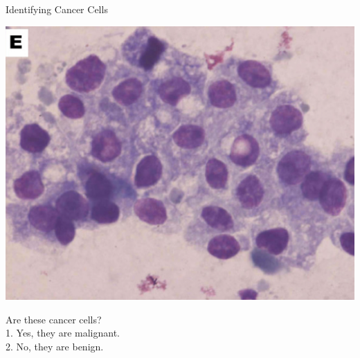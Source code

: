 \documentclass[8pt,aspectratio=169]{beamer}
\begin{document}
\begin{frame}{Identifying Cancer Cells}

\begin{center}
  \pause
  \includegraphics[scale=0.5]{figures/cancer-cells}
  \vspace{5mm}

  \pause
  \LARGE Are these cancer cells?\\
  \normalsize
  1. Yes, they are malignant.\\
  2. No, they are benign.
\end{center}

\end{frame}

\end{document}
